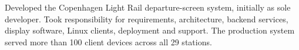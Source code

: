 Developed the Copenhagen Light Rail departure-screen system, initially as sole developer. Took responsibility for requirements, architecture, backend services, display software, Linux clients, deployment and support. The production system served more than 100 client devices across all 29 stations.
